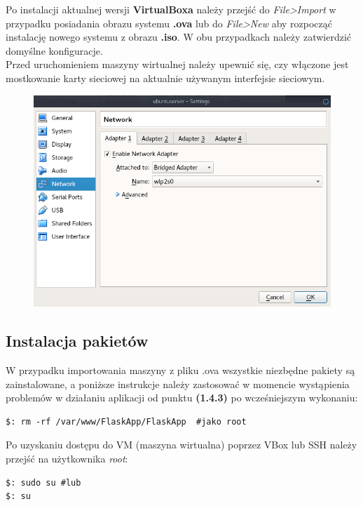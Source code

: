 \documentclass[12pt,a4paper]{article}
\begin{document}
Po instalacji aktualnej wersji \textbf{VirtualBoxa} należy przejść do \textit{File>Import} w przypadku posiadania obrazu systemu \textbf{.ova } lub do \textit{File>New } aby rozpocząć instalację nowego systemu z obrazu \textbf{.iso}. W obu przypadkach należy zatwierdzić domyślne konfiguracje.\\

Przed uruchomieniem maszyny wirtualnej należy upewnić się, czy włączone jest mostkowanie karty sieciowej na aktualnie używanym interfejsie sieciowym. 
\begin{figure}[h!]
\centering
\includegraphics[scale=0.4]{d}
\end{figure}
\newpage

\subsection{Instalacja pakietów}
\quad
W przypadku importowania maszyny z pliku .ova wszystkie niezbędne pakiety są zainstalowane, a poniższe instrukcje należy zastosować w momencie wystąpienia problemów w działaniu aplikacji od punktu \textbf{(1.4.3)} po wcześniejszym wykonaniu:
\begin{lstlisting}
$: rm -rf /var/www/FlaskApp/FlaskApp  #jako root
\end{lstlisting}
\quad

Po uzyskaniu dostępu do VM (maszyna wirtualna) poprzez VBox lub SSH należy przejść na użytkownika \textit{root}:\\
\begin{lstlisting}
$: sudo su #lub
$: su
\end{lstlisting}
\end{document}

